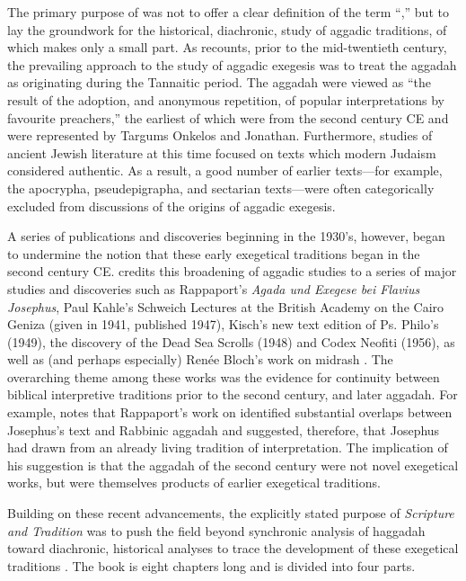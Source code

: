 The primary purpose of  was not to offer a clear
definition of the term ``\rwB,'' but to lay the
groundwork for the historical, diachronic, study of aggadic traditions,
of which \rwB makes only a small
part.\autocite[3]{vermes_zsengeller2014} As \vermes
recounts, prior to the mid-twentieth century, the prevailing approach to
the study of aggadic exegesis was to treat the aggadah as originating
during the Tannaitic period. The aggadah were viewed as ``the result of
the adoption, and anonymous repetition, of popular interpretations by
favourite preachers,'' \autocite[3]{vermes1961} the earliest of which
were from the second century CE and were represented by Targums Onkelos
and Jonathan. Furthermore, studies of ancient Jewish literature at this
time focused on texts which modern Judaism considered authentic. As a
result, a good number of earlier texts---for example, the apocrypha,
pseudepigrapha, and sectarian texts---were often categorically excluded
from discussions of the origins of aggadic
exegesis.\autocite[2]{vermes1961}

A series of publications and discoveries beginning in the 1930's,
however, began to undermine the notion that these early exegetical
traditions began in the second century CE. \vermes
credits this broadening of aggadic studies to a series of major studies
and discoveries such as Rappaport's \emph{Agada und Exegese bei Flavius
Josephus},\autocite{rappaport1930} Paul Kahle's Schweich Lectures at the
British Academy on the Cairo Geniza (given in 1941, published
1947),\autocite{kahle1947} Kisch's new text edition of Ps. Philo's
\lab (1949),\autocite{kisch1949} the discovery of the
Dead Sea Scrolls (1948) and Codex Neofiti (1956), as well as (and
perhaps especially) Renée Bloch's work on midrash
\autocites{bloch1954}{bloch1955_repr}[3--7]{vermes1961}. The overarching
theme among these works was the evidence for continuity between biblical
interpretive traditions prior to the second century, and later aggadah.
For example, \vermes notes that Rappaport's work on
\ant identified substantial overlaps between Josephus's
text and Rabbinic aggadah and suggested, therefore, that Josephus had
drawn from an already living tradition of interpretation. The
implication of his suggestion is that the aggadah of the second century
were not novel exegetical works, but were themselves products of earlier
exegetical traditions.

Building on these recent advancements, the explicitly stated purpose of
\emph{Scripture and Tradition} was to push the field beyond synchronic
analysis of haggadah toward diachronic, historical analyses to trace the
development of these exegetical traditions \autocites[1]{vermes1961}[See
also][]{bloch1955_repr}. The book is eight chapters long and is divided
into four parts.

